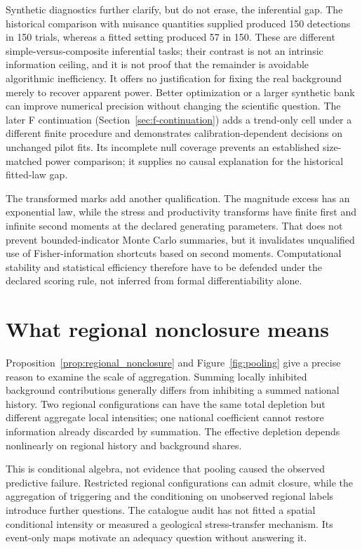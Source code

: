 Synthetic diagnostics further clarify, but do not erase, the inferential gap. The historical comparison with nuisance quantities supplied produced 150 detections in 150 trials, whereas a fitted setting produced 57 in 150. These are different simple-versus-composite inferential tasks; their contrast is not an intrinsic information ceiling, and it is not proof that the remainder is avoidable algorithmic inefficiency. It offers no justification for fixing the real background merely to recover apparent power. Better optimization or a larger synthetic bank can improve numerical precision without changing the scientific question. The later F continuation (Section~\ref{sec:f-continuation}) adds a trend-only cell under a different finite procedure and demonstrates calibration-dependent decisions on unchanged pilot fits. Its incomplete null coverage prevents an established size-matched power comparison; it supplies no causal explanation for the historical fitted-law gap.

The transformed marks add another qualification. The magnitude excess has an exponential law, while the stress and productivity transforms have finite first and infinite second moments at the declared generating parameters. That does not prevent bounded-indicator Monte Carlo summaries, but it invalidates unqualified use of Fisher-information shortcuts based on second moments. Computational stability and statistical efficiency therefore have to be defended under the declared scoring rule, not inferred from formal differentiability alone.

\section{What regional nonclosure means}

Proposition~\ref{prop:regional_nonclosure} and Figure~\ref{fig:pooling} give a precise reason to examine the scale of aggregation. Summing locally inhibited background contributions generally differs from inhibiting a summed national history. Two regional configurations can have the same total depletion but different aggregate local intensities; one national coefficient cannot restore information already discarded by summation. The effective depletion depends nonlinearly on regional history and background shares.

This is conditional algebra, not evidence that pooling caused the observed predictive failure. Restricted regional configurations can admit closure, while the aggregation of triggering and the conditioning on unobserved regional labels introduce further questions. The catalogue audit has not fitted a spatial conditional intensity or measured a geological stress-transfer mechanism. Its event-only maps motivate an adequacy question without answering it.

